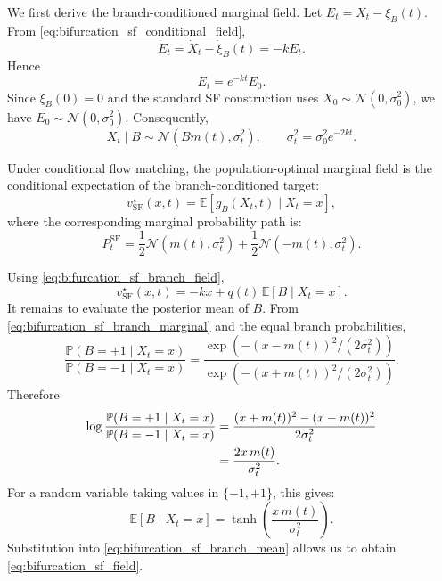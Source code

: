 We first derive the branch-conditioned  marginal field. Let
$E_t=X_t-\xi_B(t)$. From
\eqref{eq:bifurcation_sf_conditional_field},
\begin{equation}
    \dot E_t
    =
    \dot X_t-\dot\xi_B(t)
    =
    -kE_t.
\end{equation}
Hence
\begin{equation}
    E_t=e^{-kt}E_0.
\end{equation}
Since $\xi_B(0)=0$ and the standard SF construction uses
$X_0\sim\mathcal N(0,\sigma_0^2)$, we have
$E_0\sim\mathcal N(0,\sigma_0^2)$. Consequently,
\begin{equation}
    X_t\mid B
    \sim
    \mathcal N\!\left(
        Bm(t),
        \sigma_t^2
    \right),
    \qquad
    \sigma_t^2=\sigma_0^2e^{-2kt}.
    \label{eq:bifurcation_sf_branch_marginal}
\end{equation}

Under conditional flow matching, the population-optimal
marginal field is the conditional expectation of the branch-conditioned
target:
\begin{equation}
    v_{\mathrm{SF}}^\star(x,t)
    =
    \mathbb E[
        g_B(X_t,t)\mid X_t=x],
    \label{eq:bifurcation_sf_conditional_mean}
\end{equation}
where the corresponding marginal probability path is:
\begin{equation}
    P_t^{\mathrm{SF}}
    =
    \frac12\mathcal N(m(t),\sigma_t^2)
    +
    \frac12\mathcal N(-m(t),\sigma_t^2).
    \label{eq:bifurcation_sf_mixture}
\end{equation}

Using \eqref{eq:bifurcation_sf_branch_field},
\begin{equation}
    v_{\mathrm{SF}}^\star(x,t)
    =
    -kx
    +
    q(t)\,
    \mathbb E[B\mid X_t=x].
    \label{eq:bifurcation_sf_branch_mean}
\end{equation}
It remains to evaluate the posterior mean of $B$. From
\eqref{eq:bifurcation_sf_branch_marginal} and the equal branch
probabilities,
\begin{equation}
    \frac{
        \mathbb P(B=+1\mid X_t=x)
    }{
        \mathbb P(B=-1\mid X_t=x)
    }
    =
    \frac{
        \exp\!\left(
            -(x-m(t))^2/(2\sigma_t^2)
        \right)
    }{
        \exp\!\left(
            -(x+m(t))^2/(2\sigma_t^2)
        \right)
    }.
\end{equation}
Therefore
\begin{align}
    \log
    \frac{
        \mathbb P(B=+1\mid X_t=x)
    }{
        \mathbb P(B=-1\mid X_t=x)
    }
    &=
    \frac{
        (x+m(t))^2-(x-m(t))^2
    }{
        2\sigma_t^2
    }
    \notag\\
    &=
    \frac{2x\,m(t)}{\sigma_t^2}.
\end{align}
For a random variable taking values in $\{-1,+1\}$, this gives:
\begin{equation}
    \mathbb E[B\mid X_t=x]
    =
    \tanh\!\left(
        \frac{x\,m(t)}{\sigma_t^2}
    \right).
\end{equation}
Substitution into
\eqref{eq:bifurcation_sf_branch_mean} allows us to obtain
\eqref{eq:bifurcation_sf_field}.

